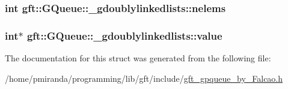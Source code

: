 \subsubsection[{\texorpdfstring{nelems}{nelems}}]{\setlength{\rightskip}{0pt plus 5cm}int gft\+::\+G\+Queue\+::\+\_\+gdoublylinkedlists\+::nelems}\hypertarget{structgft_1_1GQueue_1_1__gdoublylinkedlists_ab103b5cd4de4ad5b7053f05102c62595}{}\label{structgft_1_1GQueue_1_1__gdoublylinkedlists_ab103b5cd4de4ad5b7053f05102c62595}
\subsubsection[{\texorpdfstring{value}{value}}]{\setlength{\rightskip}{0pt plus 5cm}int$\ast$ gft\+::\+G\+Queue\+::\+\_\+gdoublylinkedlists\+::value}\hypertarget{structgft_1_1GQueue_1_1__gdoublylinkedlists_a0c1b6b1d931f88f969d1d6f1ee61828b}{}\label{structgft_1_1GQueue_1_1__gdoublylinkedlists_a0c1b6b1d931f88f969d1d6f1ee61828b}


The documentation for this struct was generated from the following file\+:\begin{DoxyCompactItemize}
\item 
/home/pmiranda/programming/lib/gft/include/\hyperlink{gft__gpqueue__by__Falcao_8h}{gft\+\_\+gpqueue\+\_\+by\+\_\+\+Falcao.\+h}\end{DoxyCompactItemize}
